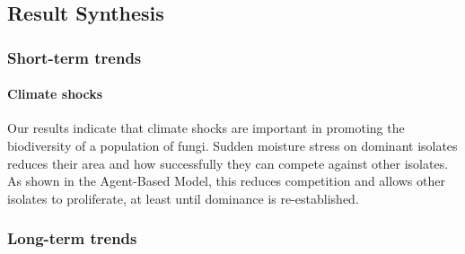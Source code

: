 \documentclass[12pt]{article}
\begin{document}









\subsection{Result Synthesis}
\subsubsection{Short-term trends}
\paragraph{Climate shocks}
Our results indicate that climate shocks are important in promoting the biodiversity of a population of fungi. Sudden moisture stress on dominant isolates reduces their area and how successfully they can compete against other isolates. As shown in the Agent-Based Model, this reduces competition and allows other isolates to proliferate, at least until dominance is re-established.

\subsubsection{Long-term trends}
\end{document}
